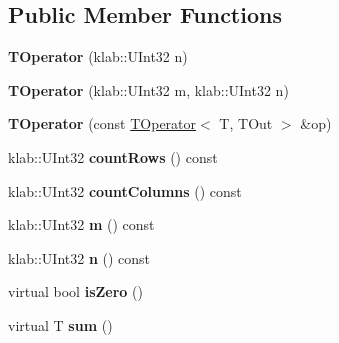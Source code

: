 \subsection*{Public Member Functions}
\begin{DoxyCompactItemize}
\item 
{\bfseries T\+Operator} (klab\+::\+U\+Int32 n)\hypertarget{classkl1p_1_1TOperator_afe8ab1c8c844c9a5629234f04f6f1f1b}{}\label{classkl1p_1_1TOperator_afe8ab1c8c844c9a5629234f04f6f1f1b}

\item 
{\bfseries T\+Operator} (klab\+::\+U\+Int32 m, klab\+::\+U\+Int32 n)\hypertarget{classkl1p_1_1TOperator_a07108352bd48a44e142ec3fcb477d8ec}{}\label{classkl1p_1_1TOperator_a07108352bd48a44e142ec3fcb477d8ec}

\item 
{\bfseries T\+Operator} (const \hyperlink{classkl1p_1_1TOperator}{T\+Operator}$<$ T, T\+Out $>$ \&op)\hypertarget{classkl1p_1_1TOperator_ae20312fa653d1a24565826b206834a8e}{}\label{classkl1p_1_1TOperator_ae20312fa653d1a24565826b206834a8e}

\item 
klab\+::\+U\+Int32 {\bfseries count\+Rows} () const \hypertarget{classkl1p_1_1TOperator_a200628f972373846262200f824e83506}{}\label{classkl1p_1_1TOperator_a200628f972373846262200f824e83506}

\item 
klab\+::\+U\+Int32 {\bfseries count\+Columns} () const \hypertarget{classkl1p_1_1TOperator_a5cb92acc712b812de0644336244a8565}{}\label{classkl1p_1_1TOperator_a5cb92acc712b812de0644336244a8565}

\item 
klab\+::\+U\+Int32 {\bfseries m} () const \hypertarget{classkl1p_1_1TOperator_a0c819c04c0eaac27029f8bad67487b97}{}\label{classkl1p_1_1TOperator_a0c819c04c0eaac27029f8bad67487b97}

\item 
klab\+::\+U\+Int32 {\bfseries n} () const \hypertarget{classkl1p_1_1TOperator_aba32ce87c5bd3df280ed4a2359ccbf2d}{}\label{classkl1p_1_1TOperator_aba32ce87c5bd3df280ed4a2359ccbf2d}

\item 
virtual bool {\bfseries is\+Zero} ()\hypertarget{classkl1p_1_1TOperator_aa300f83e90d085428cff5910138c5a23}{}\label{classkl1p_1_1TOperator_aa300f83e90d085428cff5910138c5a23}

\item 
virtual T {\bfseries sum} ()\hypertarget{classkl1p_1_1TOperator_a97083e78b9b294e747895686cae26b76}{}\label{classkl1p_1_1TOperator_a97083e78b9b294e747895686cae26b76}


\end{DoxyCompactItemize}
